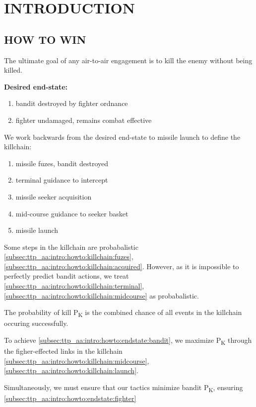 \section{INTRODUCTION}
\subsection{HOW TO WIN}
\begin{tcoloritemize}
    \blueitem[Goal]
    The ultimate goal of any air-to-air engagement is to kill the enemy without being killed. 

    \medskip
    \textbf{Desired end-state:}
    \begin{enumerate}[label=\bfseries(\arabic*)]
        \item bandit destroyed by fighter ordnance
        \label{subsec:ttp_aa:intro:howto:endstate:bandit}
        \item fighter undamaged, remains combat effective
        \label{subsec:ttp_aa:intro:howto:endstate:fighter}
    \end{enumerate}

    We work backwards from the desired end-state 
    to missile launch to define the killchain:
    \begin{enumerate}[label=\textbf{(\alph*)}]
        \item missile fuzes, bandit destroyed
        \label{subsec:ttp_aa:intro:howto:killchain:fuzes}
        \item terminal guidance to intercept
        \label{subsec:ttp_aa:intro:howto:killchain:terminal}
        \item missile seeker acquisition
        \label{subsec:ttp_aa:intro:howto:killchain:acquired}
        \item mid-course guidance to seeker basket
        \label{subsec:ttp_aa:intro:howto:killchain:midcourse}
        \item missile launch
        \label{subsec:ttp_aa:intro:howto:killchain:launch}
    \end{enumerate}

    Some steps in the killchain are probabalistic 
    \ref{subsec:ttp_aa:intro:howto:killchain:fuzes},
    \ref{subsec:ttp_aa:intro:howto:killchain:acquired}.
    However, as it is impossible to perfectly predict bandit actions, 
    we treat 
    \ref{subsec:ttp_aa:intro:howto:killchain:terminal},
    \ref{subsec:ttp_aa:intro:howto:killchain:midcourse}
    as probabalistic.

    \medskip
    The probability of kill P\textsubscript{K} is the combined chance of all events in the killchain occuring successfully.

    To achieve \ref{subsec:ttp_aa:intro:howto:endstate:bandit},
    we maximize P\textsubscript{K} through the figher-effected links in the killchain
    \ref{subsec:ttp_aa:intro:howto:killchain:midcourse},
    \ref{subsec:ttp_aa:intro:howto:killchain:launch}.

    \medskip
    Simultaneously, we must ensure that our tactics minimize bandit P\textsubscript{K}, 
    ensuring \ref{subsec:ttp_aa:intro:howto:endstate:fighter}
\end{tcoloritemize}


